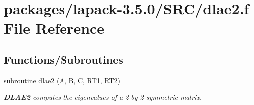 \hypertarget{dlae2_8f}{}\section{packages/lapack-\/3.5.0/\+S\+R\+C/dlae2.f File Reference}
\label{dlae2_8f}
\subsection*{Functions/\+Subroutines}
\begin{DoxyCompactItemize}
\item 
subroutine \hyperlink{group__auxOTHERauxiliary_ga8a36d905c1c66d345f791b91254da0ae}{dlae2} (\hyperlink{classA}{A}, B, C, R\+T1, R\+T2)
\begin{DoxyCompactList}\small\item\em {\bfseries D\+L\+A\+E2} computes the eigenvalues of a 2-\/by-\/2 symmetric matrix. \end{DoxyCompactList}\end{DoxyCompactItemize}
